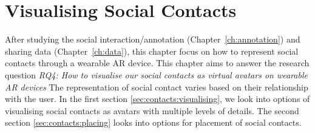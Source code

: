 \chapter{Visualising Social Contacts}
\label{ch:contacts} 

After studying the social interaction/annotation (Chapter~\ref{ch:annotation}) and sharing data (Chapter~\ref{ch:data}), this chapter focus on how to represent social contacts through a wearable AR device. 
This chapter aims to answer the research question \textit{RQ4: How to visualise our social contacts as virtual avatars on wearable AR devices}
The representation of social contact varies based on their relationship with the user. 
In the first section \ref{sec:contacts:visualising}, we look into options of visualising social contacts as avatars with multiple levels of details. The second section \ref{sec:contacts:placing} looks into options for placement of social contacts. 



